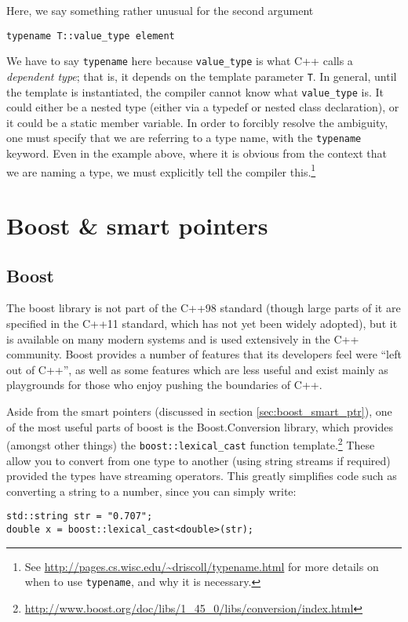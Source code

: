\documentclass[a4paper]{scrartcl}
\begin{document}
Here, we say something rather unusual for the second argument
\begin{verbatim}
typename T::value_type element
\end{verbatim}

We have to say \verb|typename| here because \verb|value_type| is what C++ calls a \emph{dependent type}; that is, it depends on the template parameter \verb|T|. In general, until the template is instantiated, the compiler cannot know what \verb|value_type| is. It could either be a nested type (either via a typedef or nested class declaration), or it could be a static member variable. In order to forcibly resolve the ambiguity, one must specify that we are referring to a type name, with the \verb|typename| keyword. Even in the example above, where it is obvious from the context that we are naming a type, we must explicitly tell the compiler this.\footnote{See \url{http://pages.cs.wisc.edu/~driscoll/typename.html} for more details on when to use \texttt{typename}, and why it is necessary.} 

\section{Boost \& smart pointers}\label{sec:boost}
\subsection{Boost}
The boost library is not part of the C++98 standard (though large parts of it are specified in the C++11 standard, which has not yet been widely adopted), but it is available on many modern systems and is used extensively in the C++ community. Boost provides a number of features that its developers feel were ``left out of C++'', as well as some features which are less useful and exist mainly as playgrounds for those who enjoy pushing the boundaries of C++.

Aside from the smart pointers (discussed in section \ref{sec:boost_smart_ptr}), one of the most useful parts of boost is the Boost.Conversion library, which provides (amongst other things) the \verb|boost::lexical_cast| function template.\footnote{\url{http://www.boost.org/doc/libs/1_45_0/libs/conversion/index.html}} These allow you to convert from one type to another (using string streams if required) provided the types have streaming operators. This greatly simplifies code such as converting a string to a number, since you can simply write:

\begin{verbatim}
std::string str = "0.707";
double x = boost::lexical_cast<double>(str);
\end{verbatim}
\end{document}
